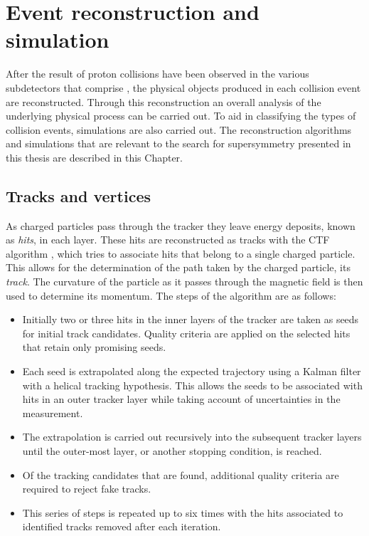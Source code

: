 \chapter{Event reconstruction and simulation}
\label{chap:reconstruction}

After the result of proton collisions have been observed in the
various subdetectors that comprise \CMS, the physical objects produced
in each collision event are reconstructed. Through this reconstruction
an overall analysis of the underlying physical process can be carried
out. To aid in classifying the types of collision events, \MC
simulations are also carried out. The reconstruction algorithms and
simulations that are relevant to the search for supersymmetry
presented in this thesis are described in this Chapter.

\section{Tracks and vertices}
\label{sec:tracks_reco}

As charged particles pass through the \CMS tracker they leave energy
deposits, known as \emph{hits}, in each layer. These hits are
reconstructed as tracks with the \ac{CTF} algorithm
\cite{Chatrchyan:2014fea}, which tries to associate hits that belong
to a single charged particle. This allows for the determination of the
path taken by the charged particle, its \emph{track}. The curvature of
the particle as it passes through the magnetic field is then used to
determine its momentum. The steps of the algorithm are as follows:

\begin{itemize}
\item{Initially two or three hits in the inner layers of the tracker
are taken as seeds for initial track candidates. Quality
criteria are applied on the selected hits that retain only promising
seeds.} 
\item{Each seed is extrapolated along the expected trajectory using a
Kalman filter \cite{Fruhwirth:1987fm} with a helical tracking
hypothesis.  This allows the seeds to be associated with hits in an
outer tracker layer while taking account of uncertainties in the
measurement.} 
\item{The extrapolation is carried out recursively into the subsequent
tracker layers until the outer-most layer, or another
stopping condition, is reached.} 
\item{Of the tracking candidates that are found, additional quality
criteria are required to reject fake tracks.}
\item{This series of steps is repeated up to six times with the hits
associated to identified tracks removed after each iteration. }
\end{itemize}

